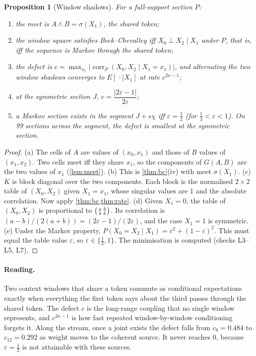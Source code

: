 \documentclass[11pt]{article}
\newtheorem{proposition}[theorem]{Proposition}
\theoremstyle{definition}
\begin{document}
\begin{proposition}[Window shadows]\label{prop:windows}
For a full-support section $P$:
\begin{enumerate}[label=(\alph*)]
\item the meet is $A\wedge B=\sigma(X_1)$, the shared token;
\item the window square satisfies Beck--Chevalley iff $X_0\perp X_2\mid X_1$ under $P$, that is, iff the sequence is Markov through the
  shared token;
\item the defect is $c=\max_{x_1}\big|\operatorname{corr}_P(X_0,X_2\mid X_1=x_1)\big|$, and alternating the two window shadows converges
  to $E[\,\cdot\mid X_1]$ at rate $c^{2n-1}$;
\item at the symmetric section $J$, $c=\dfrac{|2\varepsilon-1|}{2\varepsilon}$;
\item a Markov section exists in the segment $J+s\chi$ iff $\varepsilon=\tfrac12$ (for $\tfrac13<\varepsilon<1$). On 99 sections across
  the segment, the defect is smallest at the symmetric section.
\end{enumerate}
\end{proposition}
\begin{proof}
(a) The cells of $A$ are values of $(x_0,x_1)$ and those of $B$ values of $(x_1,x_2)$. Two cells meet iff they share $x_1$, so the
components of $G(A,B)$ are the two values of $x_1$ (\cref{lem:meet}).
(b) This is \cref{thm:bc}(iv) with meet $\sigma(X_1)$.
(c) $K$ is block diagonal over the two components. Each block is the normalised $2\times2$ table of $(X_0,X_2)$ given $X_1=x_1$, whose
singular values are $1$ and the absolute correlation. Now apply \cref{thm:bc,thm:rate}.
(d) Given $X_1=0$, the table of $(X_0,X_2)$ is proportional to $\begin{psmallmatrix}a&b\\b&b\end{psmallmatrix}$. Its correlation is
$(a-b)/(2(a+b))=(2\varepsilon-1)/(2\varepsilon)$, and the case $X_1=1$ is symmetric.
(e) Under the Markov property, $P(X_0=X_2\mid X_1)=\varepsilon^2+(1-\varepsilon)^2$. This must equal the table value $\varepsilon$, so
$\varepsilon\in\{\tfrac12,1\}$. The minimisation is computed (checks L3--L5, L7).
\end{proof}

\paragraph{Reading.} Two context windows that share a token commute as conditional expectations exactly when everything the first
token says about the third passes through the shared token. The defect $c$ is the long-range coupling that no single window
represents, and $c^{2n-1}$ is how fast repeated window-by-window conditioning forgets it. Along the stream, once a joint exists the
defect falls from $c_8=0.484$ to $c_{12}=0.292$ as weight moves to the coherent source. It never reaches $0$, because $\varepsilon=\tfrac12$
is not attainable with these sources.
\end{document}
